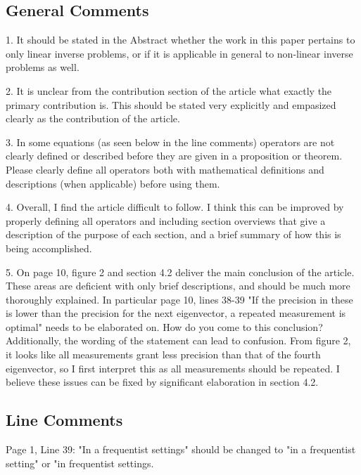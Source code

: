 \documentclass{amsart}
\numberwithin{equation}{section}
\begin{document}
\subsection{General Comments}

1. It should be stated in the Abstract whether the work in this paper
pertains to only linear inverse problems, or if it is applicable in
general to non-linear inverse problems as well.



2. It is unclear from the contribution section of the article what
exactly the primary contribution is. This should be stated very
explicitly and empasized clearly as the contribution of the article.

3. In some equations (as seen below in the line comments) operators
are not clearly defined or described before they are given in a
proposition or theorem. Please clearly define all operators both with
mathematical definitions and descriptions (when applicable) before
using them.

4. Overall, I find the article difficult to follow. I think this can
be improved by properly defining all operators and including section
overviews that give a description of the purpose of each section, and
a brief summary of how this is being accomplished.


5. On page 10, figure 2 and section 4.2 deliver the main conclusion of
the article. These areas are deficient with only brief descriptions,
and should be much more thoroughly explained. In particular page 10,
lines 38-39 "If the precision in these is lower than the precision for
the next eigenvector, a repeated measurement is optimal" needs to be
elaborated on. How do you come to this conclusion? Additionally, the
wording of the statement can lead to confusion. From figure 2, it
looks like all measurements grant less precision than that of the
fourth eigenvector, so I first interpret this as all measurements
should be repeated. I believe these issues can be fixed by significant
elaboration in section 4.2.


\subsection{Line Comments}

Page 1, Line 39: "In a frequentist settings" should be changed to "in
a frequentist setting" or "in frequentist settings. 
\end{document}

